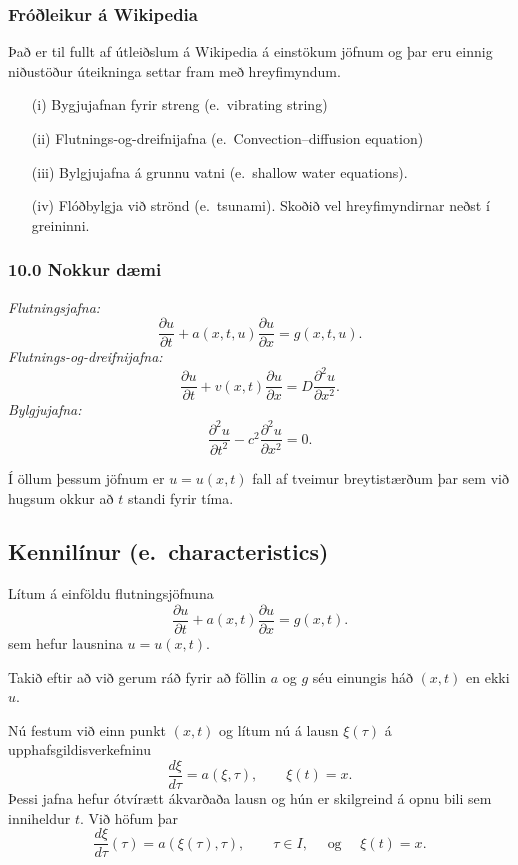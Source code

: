 \documentclass[icelandic,a4paper,12pt]{article}
\begin{document}
\subsubsection{Fróðleikur á Wikipedia} 
Það er til fullt af útleiðslum á Wikipedia á einstökum jöfnum og þar
eru einnig  niðustöður úteikninga settar fram með hreyfimyndum.

  \begin{enumerate}
  \item[(i)] Bygjujafnan fyrir streng (e.~vibrating string)
  \item[(ii)] Flutnings-og-dreifnijafna (e.~Convection–diffusion
    equation) 
  \item[(iii)] Bylgjujafna á grunnu vatni
(e.~shallow water equations).
  \item[(iv)]  Flóðbylgja við strönd (e.~tsunami).  Skoðið vel
    hreyfimyndirnar neðst í greininni. 
  \end{enumerate}



\subsubsection{10.0 Nokkur dæmi} 
{\it Flutningsjafna:}
$$
\dfrac{\partial u}{\partial t}
+a(x,t,u)\dfrac{\partial u}{\partial x}=g(x,t,u).
$$
{\it Flutnings-og-dreifnijafna:}
$$
\dfrac{\partial u}{\partial t}
+v(x,t)\dfrac{\partial u}{\partial x}=D
\dfrac{\partial^2 u}{\partial x^2}.
$$
{\it Bylgjujafna:}
$$
\dfrac{\partial^2 u}{\partial t^2}
-c^2\dfrac{\partial^2 u}{\partial x^2}=0.
$$

Í öllum þessum jöfnum er $u=u(x,t)$ fall af tveimur breytistærðum 
þar sem við hugsum okkur að $t$ standi fyrir tíma.



\subsection{Kennilínur (e.~characteristics)} 
Lítum á einföldu flutningsjöfnuna 
$$
\dfrac{\partial u}{\partial t}
+a(x,t)\dfrac{\partial u}{\partial x}=g(x,t).
$$
sem hefur lausnina $u=u(x,t)$.  

\smallskip 
Takið eftir að við gerum ráð fyrir að föllin $a$ og $g$ séu 
einungis háð  $(x,t)$ en ekki $u$. 

\smallskip
Nú festum við einn punkt $(x,t)$ og 
lítum nú á lausn $\xi(\tau)$ á upphafsgildisverkefninu
$$
  \dfrac{d\xi}{d\tau}=a(\xi,\tau), \qquad \xi(t)=x.
$$
Þessi jafna hefur ótvírætt ákvarðaða lausn og hún er skilgreind 
á opnu bili sem inniheldur $t$.  Við höfum þar
$$
\dfrac{d\xi}{d\tau}(\tau)= a(\xi(\tau),\tau), \qquad \tau \in I,
\quad \text{ og } \quad \xi(t)=x.
$$
\end{document}

